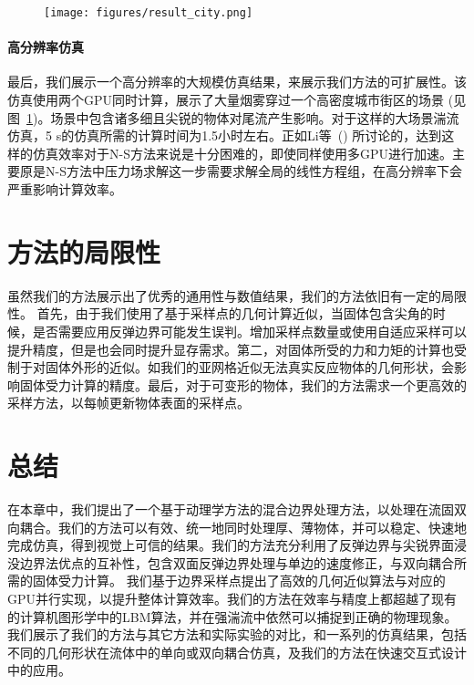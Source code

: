 \begin{figure}[!htbp]
  \centering
    \texttt{[image: figures/result\_city.png]}
  \label{img:result-city}
\end{figure}

\paragraph{高分辨率仿真}
最后，我们展示一个高分辨率的大规模仿真结果，来展示我们方法的可扩展性。该仿真使用两个GPU同时计算，展示了大量烟雾穿过一个高密度城市街区的场景 (见图~\ref{img:result-city})。场景中包含诸多细且尖锐的物体对尾流产生影响。对于这样的大场景湍流仿真，5 s的仿真所需的计算时间为1.5小时左右。正如Li等~(\citeyear{Li-2020}) 所讨论的，达到这样的仿真效率对于N-S方法来说是十分困难的，即使同样使用多GPU进行加速。主要原是N-S方法中压力场求解这一步需要求解全局的线性方程组，在高分辨率下会严重影响计算效率。

\section{方法的局限性}
虽然我们的方法展示出了优秀的通用性与数值结果，我们的方法依旧有一定的局限性。
首先，由于我们使用了基于采样点的几何计算近似，当固体包含尖角的时候，是否需要应用反弹边界可能发生误判。增加采样点数量或使用自适应采样可以提升精度，但是也会同时提升显存需求。第二，对固体所受的力和力矩的计算也受制于对固体外形的近似。如我们的亚网格近似无法真实反应物体的几何形状，会影响固体受力计算的精度。最后，对于可变形的物体，我们的方法需求一个更高效的采样方法，以每帧更新物体表面的采样点。

\section{总结}
在本章中，我们提出了一个基于动理学方法的混合边界处理方法，以处理在流固双向耦合。我们的方法可以有效、统一地同时处理厚、薄物体，并可以稳定、快速地完成仿真，得到视觉上可信的结果。我们的方法充分利用了反弹边界与尖锐界面浸没边界法优点的互补性，包含双面反弹边界处理与单边的速度修正，与双向耦合所需的固体受力计算。
我们基于边界采样点提出了高效的几何近似算法与对应的GPU并行实现，以提升整体计算效率。我们的方法在效率与精度上都超越了现有的计算机图形学中的LBM算法，并在强湍流中依然可以捕捉到正确的物理现象。
我们展示了我们的方法与其它方法和实际实验的对比，和一系列的仿真结果，包括不同的几何形状在流体中的单向或双向耦合仿真，及我们的方法在快速交互式设计中的应用。